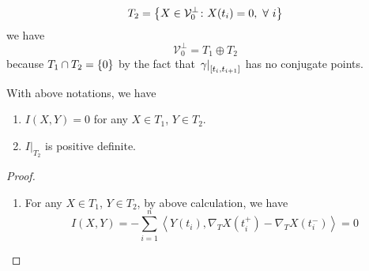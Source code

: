 \begin{enumerate}[label=\arabic{*}.]
	\begin{equation*}
		T_2 = \left\{X \in \mathcal{V}_0^\perp \colon X(t_i) = 0,~\forall~i\right\}
	\end{equation*}
	we have
	\begin{equation*}
		\mathcal{V}_0^\perp = T_1 \oplus T_2
	\end{equation*}
	because $T_1 \cap T_2 = \left\{0\right\}$ by the fact that $\left.\gamma\right\lvert_{[t_i,t_{i+1}]}$ has no conjugate points.
	\begin{lem}
		With above notations, we have
		\begin{enumerate}[label=(\arabic{*})]
			\item $I(X,Y) = 0$ for any $X \in T_1$, $Y \in T_2$.
			\item $I|_{T_2}$ is positive definite.
		\end{enumerate}
	\end{lem}
	\begin{proof}
		\begin{enumerate}[label=(\arabic{*})]
			\item For any $X \in T_1$, $Y \in T_2$, by above calculation, we have
			\begin{equation*}
				I(X, Y)=-\sum_{i=1}^n\left\langle Y\left(t_i\right), \nabla_T X\left(t_i^{+}\right)-\nabla_T X\left(t_i^{-}\right)\right\rangle = 0
			\end{equation*}


\end{enumerate}
\end{proof}
\end{enumerate}

